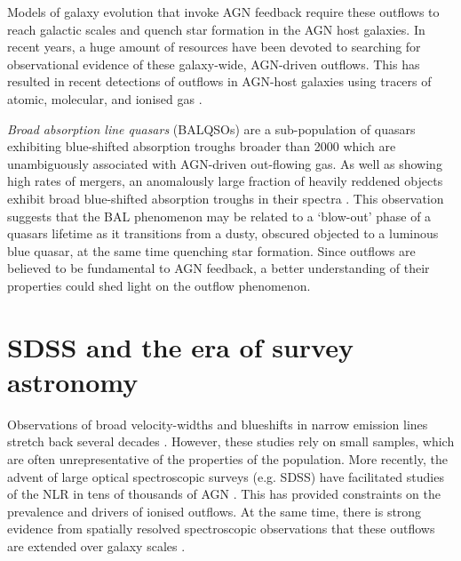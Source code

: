 Models of galaxy evolution that invoke AGN feedback require these outflows to reach galactic scales and quench star formation in the AGN host galaxies. 
In recent years, a huge amount of resources have been devoted to searching for observational evidence of these galaxy-wide, AGN-driven outflows. 
This has resulted in recent detections of outflows in AGN-host galaxies using tracers of atomic, molecular, and ionised gas \citep[e.g.][]{nesvadba06,arav08,nesvadba08,moe09,dunn10,alexander10,harrison12,harrison14,nesvadba10,rupke13,veilleux13,nardini15,feruglio10,alatalo11,cimatti13,cicone14}.  


{\it Broad absorption line quasars} (BALQSOs) are a sub-population of quasars exhibiting blue-shifted absorption troughs broader than 2000 \kms \citep{weymann91} which are unambiguously associated with AGN-driven out-flowing gas. 
As well as showing high rates of mergers, an anomalously large fraction of heavily reddened objects exhibit broad blue-shifted absorption troughs in their spectra \citep{urrutia09, glikman12}. 
This observation suggests that the BAL phenomenon may be related to a `blow-out' phase of a quasars lifetime as it transitions from a dusty, obscured objected to a luminous blue quasar, at the same time quenching star formation. 
Since outflows are believed to be fundamental to AGN feedback, a better understanding of their properties could shed light on the outflow phenomenon. 


\section{SDSS and the era of survey astronomy}


 

Observations of broad velocity-widths and blueshifts in narrow emission lines stretch back several decades \citep[e.g.][]{weedman70,stockton76,heckman81,veron81,feldman82,heckman84,vrtilek85,whittle85,boroson92}. 
However, these studies rely on small samples, which are often unrepresentative of the properties of the population. 
More recently, the advent of large optical spectroscopic surveys (e.g. SDSS) have facilitated studies of the NLR in tens of thousands of AGN \citep[e.g.][]{boroson05,greene05a,zhang11,mullaney13,zakamska14,shen14}. 
This has provided constraints on the prevalence and drivers of ionised outflows.   
At the same time, there is strong evidence from spatially resolved spectroscopic observations that these outflows are extended over galaxy scales \citep[e.g.][]{greene09,greene11,hainline13,harrison12,harrison14}. 

